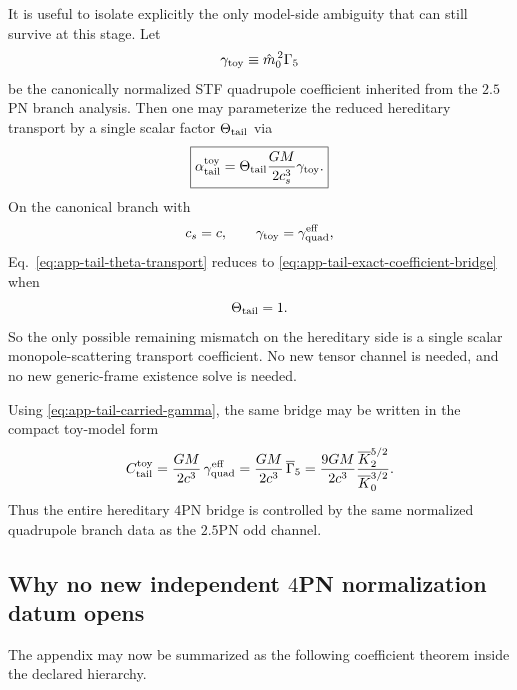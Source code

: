\documentclass[11pt]{article}
\begin{document}
It is useful to isolate explicitly the only model-side ambiguity that can still
survive at this stage.  Let
\begin{equation}
\gamma_{\rm toy}
\equiv
\hat m_0^{\,2}\Gamma_5
\label{eq:app-tail-gamma-toy}
\end{equation}
be the canonically normalized STF quadrupole coefficient inherited from the
$2.5$PN branch analysis.  Then one may parameterize the reduced hereditary
transport by a single scalar factor $\Theta_{\rm tail}$ via
\begin{equation}
\boxed{
\alpha_{\rm tail}^{\rm toy}
=
\Theta_{\rm tail}
\frac{GM}{2c_s^3}
\gamma_{\rm toy}.
}
\label{eq:app-tail-theta-transport}
\end{equation}
On the canonical branch with
\begin{equation}
c_s=c,
\qquad
\gamma_{\rm toy}=\gamma_{\rm quad}^{\rm eff},
\label{eq:app-tail-canonical-branch}
\end{equation}
Eq.~\eqref{eq:app-tail-theta-transport} reduces to
\eqref{eq:app-tail-exact-coefficient-bridge} when
\begin{equation}
\Theta_{\rm tail}=1.
\label{eq:app-tail-theta-one}
\end{equation}
So the only possible remaining mismatch on the hereditary side is a single
scalar monopole-scattering transport coefficient.  No new tensor channel is
needed, and no new generic-frame existence solve is needed.

Using \eqref{eq:app-tail-carried-gamma}, the same bridge may be written in the
compact toy-model form
\begin{equation}
C_{\mathrm{tail}}^{\mathrm{toy}}
=
\frac{GM}{2c^3}\,\gamma_{\rm quad}^{\rm eff}
=
\frac{GM}{2c^3}\,\overline\Gamma_5
=
\frac{9GM}{2c^3}
\frac{\overline K_2^{5/2}}{\overline K_0^{3/2}}.
\label{eq:app-tail-toy-final-form}
\end{equation}
Thus the entire hereditary $4$PN bridge is controlled by the same normalized
quadrupole branch data as the $2.5$PN odd channel.

\subsection{Why no new independent \texorpdfstring{$4$}{4}PN normalization datum opens}
\label{app:tail-no-new-normalization-datum}

The appendix may now be summarized as the following coefficient theorem inside
the declared hierarchy.
\end{document}
